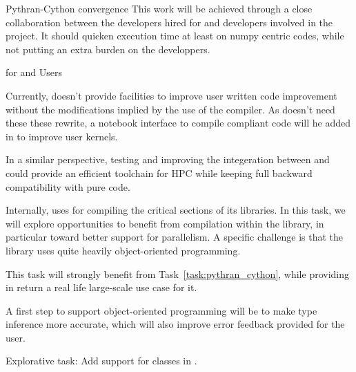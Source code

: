 \begin{Workpackage}{\thewpno}
\begin{task}{Pythran-Cython convergence}
  This work will be achieved through a close collaboration between the
  \Pythran developers hired for \TheProject and \Cython developers
  involved in the \Sage project. It should quicken \Sage execution
  time at least on numpy centric codes, while not putting an extra
  burden on the developpers.

\end{task}

\begin{task}{\Pythran for \Sage and \Sage Users}
  \label{task:pythran_sage}

  Currently, \Sage doesn't provide facilities to improve user written
  \Python code improvement without the modifications implied by the use
  of the \Cython compiler. As \Pythran doesn't need these these
  rewrite, a notebook interface to compile \Pythran compliant code will
  he added in \Sage to improve user kernels.

  In a similar perspective, testing and improving the integeration between
   and \Pythran could provide an efficient toolchain for HPC
  while keeping full backward compatibility with pure \Python code.

  Internally, \Sage uses \Cython for compiling the critical sections of
  its libraries. In this task, we will explore opportunities to
  benefit from \Pythran compilation within the \Sage library, in
  particular toward better support for parallelism. A specific
  challenge is that the \Sage library uses quite heavily
  object-oriented programming.

  This task will strongly benefit from Task~\ref{task:pythran_cython},
  while providing in return a real life large-scale use case for it.

  A first step to support object-oriented programming will be to make
  \Pythran type inference more accurate, which will also improve error
  feedback provided for the user.
\end{task}

\begin{task}{Explorative task: Add support for classes in \Pythran.}
\end{task}

\begin{WPDeliverables}
\end{WPDeliverables}
\end{Workpackage}
